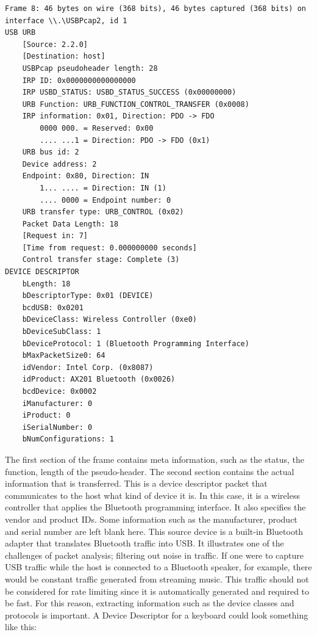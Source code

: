 \begin{lstlisting}[caption={Device Descriptor packet of a wireless controller},captionpos=b]
Frame 8: 46 bytes on wire (368 bits), 46 bytes captured (368 bits) on interface \\.\USBPcap2, id 1
USB URB
    [Source: 2.2.0]
    [Destination: host]
    USBPcap pseudoheader length: 28
    IRP ID: 0x0000000000000000
    IRP USBD_STATUS: USBD_STATUS_SUCCESS (0x00000000)
    URB Function: URB_FUNCTION_CONTROL_TRANSFER (0x0008)
    IRP information: 0x01, Direction: PDO -> FDO
        0000 000. = Reserved: 0x00
        .... ...1 = Direction: PDO -> FDO (0x1)
    URB bus id: 2
    Device address: 2
    Endpoint: 0x80, Direction: IN
        1... .... = Direction: IN (1)
        .... 0000 = Endpoint number: 0
    URB transfer type: URB_CONTROL (0x02)
    Packet Data Length: 18
    [Request in: 7]
    [Time from request: 0.000000000 seconds]
    Control transfer stage: Complete (3)
DEVICE DESCRIPTOR
    bLength: 18
    bDescriptorType: 0x01 (DEVICE)
    bcdUSB: 0x0201
    bDeviceClass: Wireless Controller (0xe0)
    bDeviceSubClass: 1
    bDeviceProtocol: 1 (Bluetooth Programming Interface)
    bMaxPacketSize0: 64
    idVendor: Intel Corp. (0x8087)
    idProduct: AX201 Bluetooth (0x0026)
    bcdDevice: 0x0002
    iManufacturer: 0
    iProduct: 0
    iSerialNumber: 0
    bNumConfigurations: 1
\end{lstlisting}

The first section of the frame contains meta information, such as the status, the function, length of the pseudo-header. The second section contains the actual information that is transferred.
This is a device descriptor packet that communicates to the host what kind of device it is. In this case, it is a wireless controller that applies the Bluetooth programming interface. It also specifies the
vendor and product IDs. Some information such as the manufacturer, product and serial number are left blank here.
This source device is a built-in Bluetooth adapter that translates Bluetooth traffic into USB. It illustrates one of the challenges of packet analysis; filtering out noise in traffic. If one were to capture USB traffic while the host is connected to a Bluetooth
speaker, for example, there would be constant traffic generated from streaming music. This traffic should not be considered for rate limiting since it is automatically generated and required to be fast.
For this reason, extracting information such as the device classes and protocols is important. A Device Descriptor for a keyboard could look something like this:


